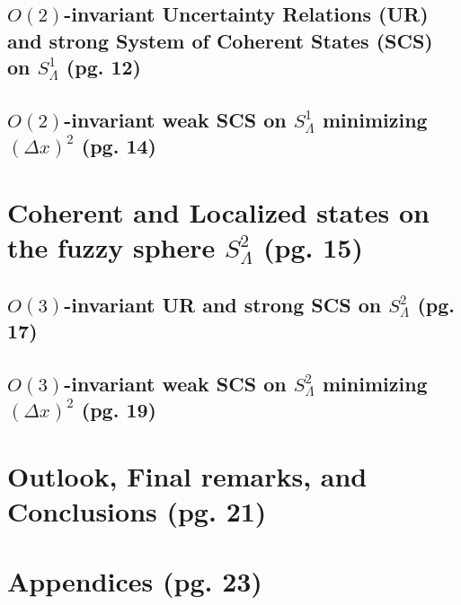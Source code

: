 \documentclass{article}
\begin{document}
\subsection{$O(2)$-invariant Uncertainty Relations (UR) and strong System of Coherent States (SCS) on $S^1_\Lambda$ (pg. 12)}

\subsection{$O(2)$-invariant weak SCS on $S^1_\Lambda$ minimizing $(\Delta x)^2$ (pg. 14)}


\section{Coherent and Localized states on the fuzzy sphere $S^2_\Lambda$ (pg. 15)}

\subsection{$O(3)$-invariant UR and strong SCS on $S^2_\Lambda$ (pg. 17)}

\subsection{$O(3)$-invariant weak SCS on $S^2_\Lambda$ minimizing $(\Delta x)^2$ (pg. 19)}

\section{Outlook, Final remarks, and Conclusions (pg. 21)}

\section{Appendices (pg. 23)}
\end{document}
